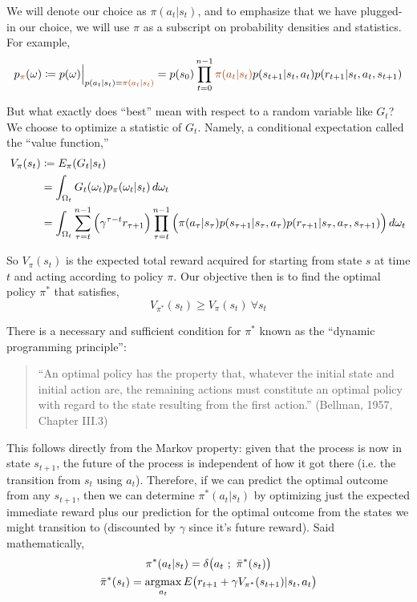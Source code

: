 We will denote our choice as $\pi(a_t|s_t)$, and to emphasize that we have plugged-in our choice, we will use $\pi$ as a subscript on probability densities and statistics. For example,
\begin{equation*}
p_{\orange{\pi}}(\omega) \coloneqq p(\omega)\Big{|}_{p(a_t|s_t) = \orange{\pi(a_t|s_t)}} = p(s_0) \prod_{t=0}^{n-1} \orange{\pi(a_t|s_t)}p(s_{t+1}|s_t,a_t)p(r_{t+1}|s_t,a_t,s_{t+1})
\end{equation*}

But what exactly does ``best'' mean with respect to a random variable like $G_t$? We choose to optimize a statistic of $G_t$. Namely, a conditional expectation called the ``value function,''
\begin{align*}
V_\pi(s_t) &\coloneqq E_\pi(G_t | s_t)\\
&= \int_{\Omega_t} G_t(\omega_t) p_\pi(\omega_t|s_t)\,d\omega_t\\
&= \int_{\Omega_t} \sum_{\tau=t}^{n-1} \Big{(}\gamma^{\tau-t} r_{\tau+1}\Big{)} \prod_{\tau=t}^{n-1} \Big{(}\pi(a_\tau|s_\tau)p(s_{\tau+1}|s_\tau,a_\tau)p(r_{\tau+1}|s_\tau,a_\tau,s_{\tau+1})\Big{)} \,d\omega_t
\end{align*}

So $V_\pi(s_t)$ is the expected total reward acquired for starting from state $s$ at time $t$ and acting according to policy $\pi$. Our objective then is to find the optimal policy $\pi^*$ that satisfies,
\begin{equation*}
V_{\pi^*}(s_t) \geq V_{\pi}(s_t)\ \forall s_t
\end{equation*}

There is a necessary and sufficient condition for $\pi^*$ known as the ``dynamic programming principle'':
\begin{quote}
``An optimal policy has the property that, whatever the initial state and initial action are, the remaining actions must constitute an optimal policy with regard to the state resulting from the first action.'' (Bellman, 1957, Chapter III.3)
\end{quote}

This follows directly from the Markov property: given that the process is now in state $s_{t+1}$, the future of the process is independent of how it got there (i.e. the transition from $s_t$ using $a_t$). Therefore, if we can predict the optimal outcome from any $s_{t+1}$, then we can determine $\pi^*(a_t|s_t)$ by optimizing just the expected immediate reward plus our prediction for the optimal outcome from the states we might transition to (discounted by $\gamma$ since it's future reward). Said mathematically,
\begin{gather*}
\pi^*(a_t|s_t) = \delta\big{(}a_t\ ;\ \bar{\pi}^*(s_t)\big{)}\\
\bar{\pi}^*(s_t) = \operatorname*{argmax}_{a_t} E\big{(}r_{t+1} + \gamma V_{\pi^*}(s_{t+1}) | s_t, a_t\big{)}
\end{gather*}

